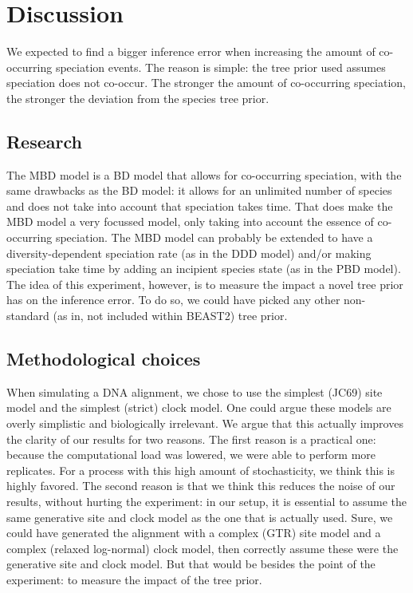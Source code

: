 \section{Discussion}

We expected to find a bigger inference error 
when increasing the amount of co-occurring speciation events.
The reason is simple: the tree prior used assumes speciation does not
co-occur. The stronger the amount of co-occurring speciation, the stronger
the deviation from the species tree prior.

\subsection{Research}

The MBD model is a BD model that allows for co-occurring speciation,
with the same drawbacks as the BD model: it allows for an unlimited 
number of species and does not take into account that speciation takes time.
That does make the MBD model a very focussed model, only taking into 
account the essence of co-occurring speciation. The MBD model can probably
be extended to have a diversity-dependent speciation rate (as in the 
DDD model) and/or making speciation take time by adding 
an incipient species state (as in the PBD model).
The idea of this experiment, however, is to measure the impact a novel
tree prior has on the inference error. To do so, we could have picked
any other non-standard (as in, not included within BEAST2) tree prior.

\subsection{Methodological choices}

When simulating a DNA alignment, we chose to use the simplest (JC69) site
model and the simplest (strict) clock model. One could argue these models
are overly simplistic and biologically irrelevant. We argue that this
actually improves the clarity of our results for two reasons. The first
reason is a practical one: because the computational load was lowered,
we were able to perform more replicates. For a process with this high
amount of stochasticity, we think this is highly favored. The second reason
is that we think this reduces the noise of our results, without 
hurting the experiment: in our setup, it is essential
to assume the same generative site and clock model as the one that is actually 
used. Sure, we could have generated the alignment with a 
complex (GTR) site model and a complex (relaxed log-normal) clock model, then
correctly assume these were the generative site and clock model.
But that would be besides the point of the experiment: to measure the impact
of the tree prior.

